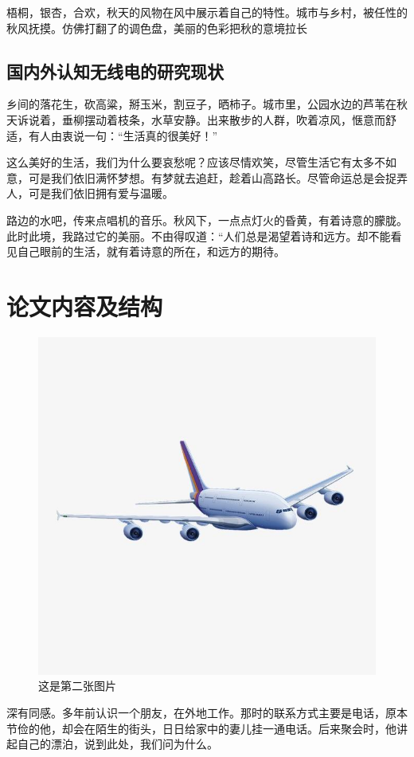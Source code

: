 梧桐，银杏，合欢，秋天的风物在风中展示着自己的特性。城市与乡村，被任性的秋风抚摸。仿佛打翻了的调色盘，美丽的色彩把秋的意境拉长
\subsection{国内外认知无线电的研究现状}
乡间的落花生，砍高粱，掰玉米，割豆子，晒柿子。城市里，公园水边的芦苇在秋天诉说着，垂柳摆动着枝条，水草安静。出来散步的人群，吹着凉风，惬意而舒适，有人由衷说一句：“生活真的很美好！”



这么美好的生活，我们为什么要哀愁呢？应该尽情欢笑，尽管生活它有太多不如意，可是我们依旧满怀梦想。有梦就去追赶，趁着山高路长。尽管命运总是会捉弄人，可是我们依旧拥有爱与温暖。



路边的水吧，传来点唱机的音乐。秋风下，一点点灯火的昏黄，有着诗意的朦胧。此时此境，我路过它的美丽。不由得叹道：“人们总是渴望着诗和远方。却不能看见自己眼前的生活，就有着诗意的所在，和远方的期待。
\section{论文内容及结构}
\begin{figure}
    \centering
    \caption{这是第二张图片}
    \includegraphics[scale=0.4]{figures/timg1.jpg}
\end{figure}
深有同感。多年前认识一个朋友，在外地工作。那时的联系方式主要是电话，原本节俭的他，却会在陌生的街头，日日给家中的妻儿挂一通电话。后来聚会时，他讲起自己的漂泊，说到此处，我们问为什么。




